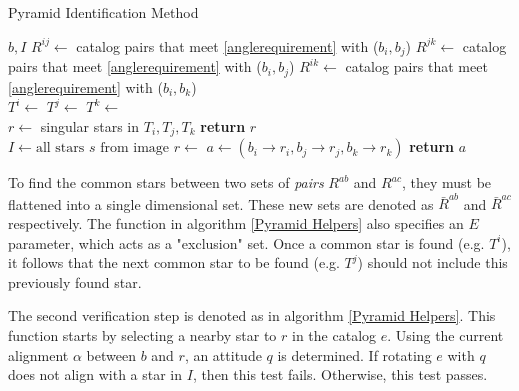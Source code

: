 \begin{algorithm}
\caption{Pyramid Identification Method}
\label{Pyramid Star Identification}
\begin{algorithmic}[1]
 {$b, I$}
\State $R^{ij} \gets$ catalog pairs that meet \eqref{anglerequirement} with ($b_i, b_j$)
\State $R^{jk} \gets$ catalog pairs that meet \eqref{anglerequirement} with ($b_i, b_j$)
\State $R^{ik} \gets$ catalog pairs that meet \eqref{anglerequirement} with ($b_i, b_k$)
\\ 
\State $T^i \gets $ 
\State $T^j \gets $ 
\State $T^k \gets $ 
\\
\State $r \gets $ singular stars in $T_i, T_j, T_k$ 
\State \textbf{return} $r$
\EndIf
\EndIf
\EndFunction
\\
\State $I \gets \text{all stars } s \text{ from image}$
\State $r \gets$ 
\State $a \gets (b_i \rightarrow r_i, b_j \rightarrow r_j, b_k \rightarrow r_k)$
\State \textbf{return} $a$
\EndIf
\EndFor
\EndFor
\EndFor
\EndProcedure
\end{algorithmic}
\end{algorithm}

To find the common stars between two sets of \textit{pairs} $R^{ab}$ and $R^{ac}$, they must be flattened into a single dimensional set. These new sets are denoted as $\bar{R}^{ab}$ and $\bar{R}^{ac}$ respectively. The function  in algorithm \eqref{Pyramid Helpers} also specifies an $E$ parameter, which acts as a "exclusion" set. Once a common star is found (e.g. $T^i$), it follows that the next common star to be found (e.g. $T^j$) should not include this previously found star. 

The second verification step is denoted as  in algorithm \eqref{Pyramid Helpers}. This function starts by selecting a nearby star to $r$ in the catalog $e$. Using the current alignment $\alpha$ between $b$ and $r$, an attitude $q$ is determined. If rotating $e$ with $q$ does not align with a star in $I$, then this test fails. Otherwise, this test passes.

